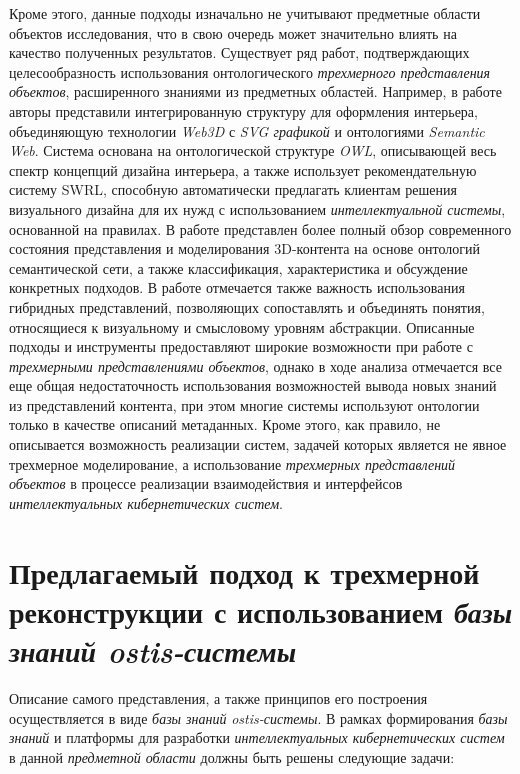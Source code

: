 Кроме этого, данные подходы изначально не учитывают предметные области объектов исследования, что в свою очередь может значительно влиять на качество полученных результатов. Существует ряд работ, подтверждающих целесообразность использования онтологического \textit{трехмерного представления объектов}, расширенного знаниями из предметных областей. Например, в работе  авторы представили интегрированную структуру для оформления интерьера, объединяющую технологии \textit{Web3D} с \textit{SVG графикой} и онтологиями \textit{Semantic Web}. Система основана на онтологической структуре \textit{OWL}, описывающей весь спектр концепций дизайна интерьера, а также использует рекомендательную систему SWRL, способную автоматически предлагать клиентам решения визуального дизайна для их нужд с использованием \textit{интеллектуальной системы}, основанной на правилах. В работе  представлен более полный обзор современного состояния представления и моделирования 3D-контента на основе онтологий семантической сети, а также классификация, характеристика и обсуждение конкретных подходов. В работе отмечается также важность использования гибридных представлений, позволяющих сопоставлять и объединять понятия, относящиеся к визуальному и смысловому уровням абстракции. Описанные подходы и инструменты предоставляют широкие возможности при работе с \textit{трехмерными представлениями объектов}, однако в ходе анализа отмечается все еще общая недостаточность использования возможностей вывода новых знаний из представлений контента, при этом многие системы используют онтологии только в качестве описаний метаданных. Кроме этого, как правило, не описывается возможность реализации систем, задачей которых является не явное трехмерное моделирование, а использование \textit{трехмерных представлений объектов} в процессе реализации взаимодействия и интерфейсов \textit{интеллектуальных кибернетических систем}.

\section{Предлагаемый подход к трехмерной реконструкции с использованием \textit{базы знаний ostis-системы}}
\label{sec_3d_models_approach}

Описание самого представления, а также принципов его построения осуществляется в виде \textit{базы знаний} \textit{ostis-системы}. В рамках формирования \textit{базы знаний} и платформы для разработки \textit{интеллектуальных кибернетических систем} в данной \textit{предметной области} должны быть решены следующие задачи:

